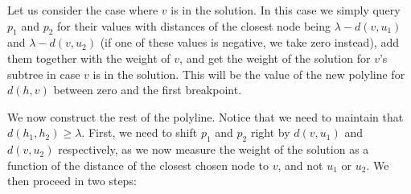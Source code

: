 \documentclass[11pt,a4paper]{article}
\theoremstyle{definition}
\theoremstyle{remark}
\begin{document}
Let us consider the case where $v$ is in the solution. In this case we simply query $p_1$ and $p_2$ for their values with distances of the closest node being $\lambda - d(v,u_1)$ and $\lambda - d(v,u_2)$ (if one of these values is negative, we take zero instead), add them together with the weight of $v$, and get the weight of the solution for $v$'s subtree in case $v$ is in the solution. This will be the value of the new polyline for $d(h,v)$ between zero and the first breakpoint.

We now construct the rest of the polyline. Notice that we need to maintain that $d(h_1,h_2) \geq \lambda$. First, we need to shift $p_1$ and $p_2$ right by $d(v,u_1)$ and $d(v,u_2)$ respectively, as we now measure the weight of the solution as a function of the distance of the closest chosen node to $v$, and not $u_1$ or $u_2$. We then proceed in two steps:
\end{document}
